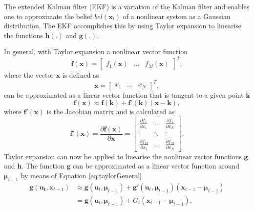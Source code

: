 \documentclass[12pt,oneside,openany,a4paper, %
afrikaans,english,
]{memoir}
\numberwithin{equation}{chapter}
\begin{document}
{The extended Kalman filter (EKF) is a variation of the Kalman filter and enables one to approximate the belief $bel({\bm{x}_t})$ of a nonlinear system as a Gaussian distribution. The EKF accomplishes this by using Taylor expansion to linearise the functions $\bm{h}(.)$ and $\bm{g}(.)$.

In general, with Taylor expansion a nonlinear vector function
\begin{equation}
\bm{f}(\bm{x}) =
\begin{bmatrix}
f_1(\bm{x}) & ... & f_M(\bm{x})
\end{bmatrix}^T,
\end{equation}
where the vector $\bm{x}$ is defined as
\begin{equation}
\bm{x} =
\begin{bmatrix}
x_1 & ... & x_N
\end{bmatrix}^T,
\end{equation}
can be approximated as a linear vector function that is tangent to a given point $\bm{k}$ 
\begin{equation}\label{eq:taylorGeneral}
\bm{f}(\bm{x}) \approx \bm{f}(\bm{k}) + \bm{f}'(\bm{k})(\bm{x-k}),
\end{equation}
where $\bm{f}'(\bm{x})$ is the Jacobian matrix and is calculated as
\begin{equation}\label{eq:jacobian}
\bm{f}'(\bm{x}) = \frac{\partial\bm{f}(\bm{x})}{\partial \bm{x}} =
\begin{bmatrix}
\frac{\partial f_1}{\partial x_1} & \dots &\frac{\partial f_1}{\partial x_N}\\
\vdots & \ddots &\vdots\\
\frac{\partial f_M}{\partial x_1} & \dots &\frac{\partial f_M}{\partial x_N}
\end{bmatrix}.
\end{equation}
Taylor expansion can now be applied to linearise the nonlinear vector functions $\bm{g}$ and $\bm{h}$. The function $\bm{g}$ can be approximated as a linear vector function around $\bm{\mu}_{t-1}$ by means of Equation \ref{eq:taylorGeneral}
\begin{equation}\label{eq:linear_taylor}
\begin{split}
\bm{g}(\bm{u_t}, \bm{x}_{t-1}) & \approx \bm{g}(\bm{u}_t, \bm{\mu}_{t-1}) + \bm{g}'(\bm{u}_t, \bm{\mu}_{t-1})(\bm{x}_{t-1} - \bm{\mu}_{t-1})\\
& = \bm{g}(\bm{u}_t, \bm{\mu}_{t-1}) + G_t(\bm{x}_{t-1} - 
\bm{\mu}_{t-1}),
\end{split}  
\end{equation}
}
\end{document}
